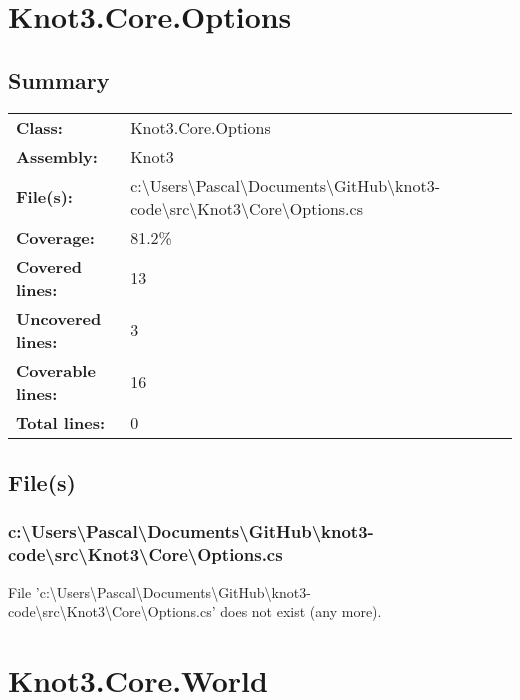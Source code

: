 \documentclass[a4paper,10pt]{article}
\begin{document}
\section{Knot3.Core.Options}
\subsection{Summary}
\begin{longtable}[l]{ll}
\textbf{Class:} & Knot3.Core.Options\\
\textbf{Assembly:} & Knot3\\
\textbf{File(s):} & \begin{minipage}[t]{12cm}{c:\textbackslash Users\textbackslash Pascal\textbackslash Documents\textbackslash GitHub\textbackslash knot3-code\textbackslash src\textbackslash Knot3\textbackslash Core\textbackslash Options.cs}\end{minipage} \\
\textbf{Coverage:} & 81.2\%\\
\textbf{Covered lines:} & 13\\
\textbf{Uncovered lines:} & 3\\
\textbf{Coverable lines:} & 16\\
\textbf{Total lines:} & 0\\
\end{longtable}
\subsection{File(s)}
\subsubsection{c:\textbackslash Users\textbackslash Pascal\textbackslash Documents\textbackslash GitHub\textbackslash knot3-code\textbackslash src\textbackslash Knot3\textbackslash Core\textbackslash Options.cs}
 File 'c:\textbackslash Users\textbackslash Pascal\textbackslash Documents\textbackslash GitHub\textbackslash knot3-code\textbackslash src\textbackslash Knot3\textbackslash Core\textbackslash Options.cs' does not exist (any more).
\newpage
\section{Knot3.Core.World}
\end{document}
